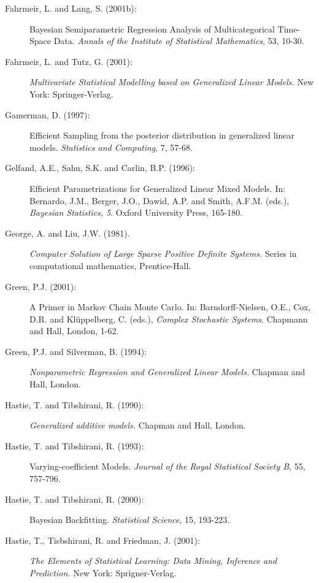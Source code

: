 \begin{description}
\item[Fahrmeir, L. and Lang, S. (2001b):] Bayesian Semiparametric Regression Analysis of Multicategorical
Time-Space Data. {\em Annals of the Institute of Statistical
Mathematics}, 53, 10-30.

\item[Fahrmeir, L. and Tutz, G. (2001):] {\em Multivariate Statistical
Modelling based on Generalized Linear Models.} New York:
Springer-Verlag.


\item[Gamerman, D. (1997):] Efficient Sampling from the posterior distribution
in generalized linear models. {\em Statistics and Computing}, 7,
57-68.

\item[Gelfand, A.E., Sahu, S.K. and Carlin, B.P. (1996):] Efficient Parametrizations for
Genera\-lized Linear Mixed Models. In: Bernardo, J.M., Berger, J.O.,
Dawid, A.P. and Smith, A.F.M. (eds.), {\em Bayesian Statistics,
5}. Oxford University Press, 165-180.

\item[George, A. and Liu, J.W. (1981).] {\em Computer Solution of Large
Sparse Positive Definite Systems.} Series in computational
mathematics, Prentice-Hall.

\item[Green, P.J. (2001):] A Primer in Markov Chain Monte Carlo. In: Barndorff-Nielsen, O.E.,
Cox, D.R. and Kl\"{u}ppelberg, C. (eds.), {\em Complex Stochastic
Systems}. Chapmann and Hall, London, 1-62.

\item[Green, P.J. and Silverman, B. (1994):] {\em Nonparametric Regression and Generalized Linear Models.} Chapman
and Hall, London.

\item[Hastie, T. and Tibshirani, R. (1990):] {\em Generalized additive models.} Chapman and
Hall, London.

\item[Hastie, T. and Tibshirani, R. (1993):] Varying-coefficient Models.
{\em Journal of the Royal Statistical Society B}, 55, 757-796.

\item[Hastie, T. and Tibshirani, R. (2000):] Bayesian Backfitting. {\em Statistical Science}, 15, 193-223.

\item[Hastie, T., Tisbshirani, R. and Friedman, J. (2001):] {\em The Elements of Statistical Learning: Data Mining,
Inference and Prediction.} New York: Sprigner-Verlag.


\end{description}
